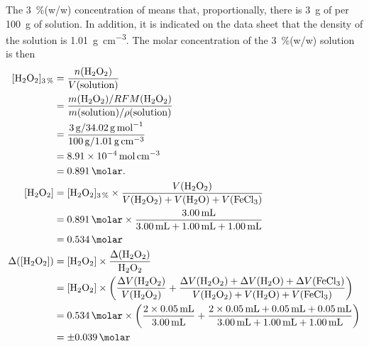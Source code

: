 \documentclass[a4paper, 12pt]{article}
\begin{document}
The \SI{3}{\%}(w/w) concentration of  means that, proportionally, there is \SI{3}{\g} of  per \SI{100}{\g} of solution. In addition, it is indicated on the data sheet \autocite{safety_h2o2} that the density of the solution is \SI{1.01}{\g\per\cm^3}. The molar concentration of the \SI{3}{\%}(w/w)  solution is then
\begin{align*}
    [\ce{H2O2}]_{\SI{3}{\%}}
    &= \dfrac{ n(\ce{H2O2}) }{ V(\text{solution}) }\\
    &= \dfrac{ m(\ce{H2O2}) / RFM(\ce{H2O2}) }{ m(\text{solution}) / \rho(\text{solution})}\\
    &= \dfrac{ \SI{3}{\g} / \SI{34.02}{\g\per\mol} } { \SI{100}{\g} / \SI{1.01}{\g\per\cm\cubed} }\\
    &= \SI{8.91E-4}{\mol\per\cm\cubed}\\
    &= \SI{0.891}{\molar}.\\
    [\ce{H2O2}]
    &= [\ce{H2O2}]_{\SI{3}{\%}} \times \dfrac{ V(\ce{H2O2}) }{ V(\ce{H2O2}) + V(\ce{H2O}) + V(\ce{FeCl3}) }\\
    &= \SI{0.891}{\molar} \times \dfrac{ \SI{3.00}{\mL} }{ \SI{3.00}{\mL} + \SI{1.00}{\mL} + \SI{1.00}{\mL} }\\
    &= \SI{0.534}{\molar}\\
    \Delta([\ce{H2O2}])
    &= [\ce{H2O2}] \times \fracDeltaP{\ce{H2O2}}\\
    &= [\ce{H2O2}] \times \left(\fracDelta{V(\ce{H2O2})} + \frac{ \Delta V(\ce{H2O2}) + \Delta V(\ce{H2O}) + \Delta V(\ce{FeCl3}) }{ V(\ce{H2O2}) + V(\ce{H2O}) + V(\ce{FeCl3}) }\right)\\
    &= \SI{0.534}{\molar} \times \left(\frac{ 2 \times \SI{0.05}{\mL} }{ \SI{3.00}{\mL} } + \frac{ 2 \times \SI{0.05}{\mL} + \SI{0.05}{\mL} + \SI{0.05}{\mL} }{ \SI{3.00}{\mL} + \SI{1.00}{\mL} + \SI{1.00}{\mL} }\right)\\
    &= \SI{+-0.039}{\molar}
\end{align*}
\end{document}
